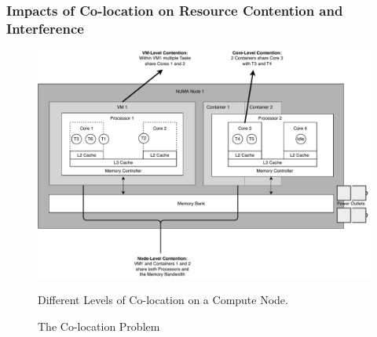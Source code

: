 \subsubsection{Impacts of Co-location on Resource Contention and Interference}
\label{sec:background_colocation_interference}

\begin{figure}[H]
    \centering
    \includegraphics[scale=0.5]{fig/02/02-coloc-overview.pdf}
    \small
    \caption{The Co-location Problem}
    \label{fig:02-coloc-overview}
    \tiny
    Different Levels of Co-location on a Compute Node.
\end{figure}


